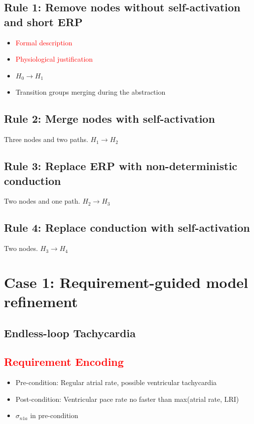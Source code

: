 \documentclass{llncs}
\begin{document}
  
\subsection{Rule 1: Remove nodes without self-activation and short ERP}
\begin{itemize}
	\item \textcolor{red}{Formal description}
    \item \textcolor{red}{Physiological justification}
    \item $H_0\rightarrow H_1$
    \item Transition groups merging during the abstraction
\end{itemize}

\subsection{Rule 2: Merge nodes with self-activation}
Three nodes and two paths. $H_1\rightarrow H_2$
\subsection{Rule 3: Replace ERP with non-deterministic conduction}
Two nodes and one path. $H_2\rightarrow H_3$
\subsection{Rule 4: Replace conduction with self-activation}
Two nodes. $H_3\rightarrow H_4$

\section{Case 1: Requirement-guided model refinement}
\subsection{Endless-loop Tachycardia}
\subsection{\textcolor{red}{Requirement Encoding}}
\begin{itemize}
	\item Pre-condition: Regular atrial rate, possible ventricular tachycardia
    \item Post-condition: Ventricular pace rate no faster than max(atrial rate, LRI)
    \item $\sigma_{n1a}$ in pre-condition
\end{itemize}
\end{document}
